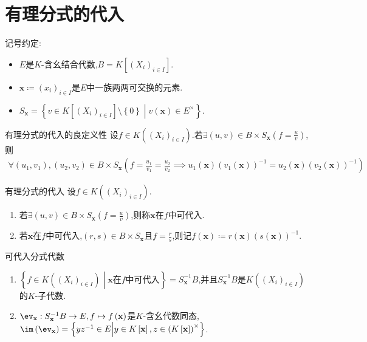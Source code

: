 \section{有理分式的代入}

记号约定:
\begin{itemize}
	\item $E$是$K$-含幺结合代数,$B=K[(X_{i})_{i\in I}]$.
	\item $\mathbf{x}\coloneq\left(x_{i}\right)_{i\in I}$是$E$中一族两两可交换的元素.
	\item $S_{\mathbf{x}}=\left\{v\in K[(X_{i})_{i\in I}]\setminus\left\{0\right\}\middle|v\left(\mathbf{x}\right)\in E^{\times}\right\}$.
\end{itemize}

\begin{lemma}{有理分式的代入的良定义性}{}
	设$f\in K((X_{i})_{i\in I})$.若$\exists\left(u,v\right)\in B\times S_{\mathbf{x}}\left(f=\frac{u}{v}\right)$,则
	\begin{align*}
		\forall\left(u_{1},v_{1}\right),\left(u_{2},v_{2}\right)\in B\times S_{\mathbf{x}}\left(f=\frac{u_{1}}{v_{1}}=\frac{u_{2}}{v_{2}}\implies u_{1}\left(\mathbf{x}\right)\left(v_{1}\left(\mathbf{x}\right)\right)^{-1}=u_{2}\left(\mathbf{x}\right)\left(v_{2}\left(\mathbf{x}\right)\right)^{-1}\right)
	\end{align*}
\end{lemma}

\begin{definition}{有理分式的代入}{}
	设$f\in K((X_{i})_{i\in I})$.
	\begin{enumerate}
		\item 若$\exists\left(u,v\right)\in B\times S_{\mathbf{x}}\left(f=\frac{u}{v}\right)$,则称$\mathbf{x}$在$f$中可代入.
		\item 若$\mathbf{x}$在$f$中可代入,$\left(r,s\right)\in B\times S_{\mathbf{x}}$且$f=\frac{r}{s}$,则记$f\left(\mathbf{x}\right)\coloneq r\left(\mathbf{x}\right)\left(s\left(\mathbf{x}\right)\right)^{-1}$.
	\end{enumerate}
\end{definition}

\begin{proposition}{可代入分式代数}{}
	\begin{enumerate}
		\item $\left\{f\in K((X_{i})_{i\in I})\middle|\mathbf{x}\text{在}f\text{中可代入}\right\}=S_{\mathbf{x}}^{-1}B$,并且$S_{\mathbf{x}}^{-1}B$是$K((X_{i})_{i\in I})$的$K$-子代数.
		\item $\ev_{\mathbf{x}}:S_{\mathbf{x}}^{-1}B\to E,f\mapsto f\left(\mathbf{x}\right)$是$K$-含幺代数同态,$\im\left(\ev_{\mathbf{x}}\right)=\left\{yz^{-1}\in E\middle|y\in K\left[\mathbf{x}\right],z\in\left(K\left[\mathbf{x}\right]\right)^{\times}\right\}$.
	\end{enumerate}
\end{proposition}

